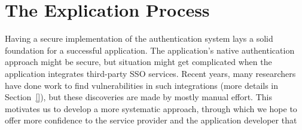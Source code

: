 \chapter{The Explication Process}
\label{sec:explication}

Having a secure implementation of the authentication system lays a solid foundation for a successful application.  The application's native authentication approach might be secure, but situation might get complicated when the application integrates third-party SSO services.  Recent years, many researchers have done work to find vulnerabilities in such integrations (more details in Section~\ref{}), but these discoveries are made by mostly manual effort.  This motivates us to develop a more systematic approach, through which we hope to offer more confidence to the service provider and the application developer that 